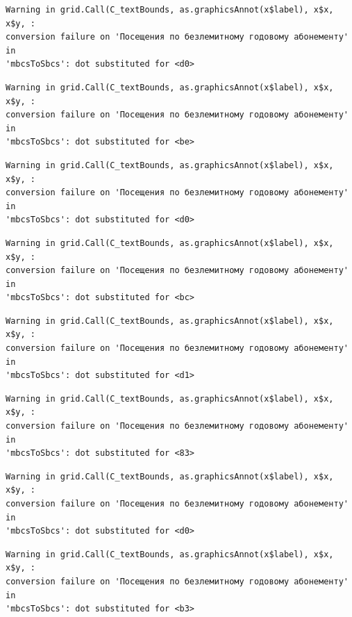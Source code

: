 \documentclass[
  letterpaper,
  DIV=11,
  numbers=noendperiod]{scrartcl}
\begin{document}
\begin{verbatim}
Warning in grid.Call(C_textBounds, as.graphicsAnnot(x$label), x$x, x$y, :
conversion failure on 'Посещения по безлемитному годовому абонементу' in
'mbcsToSbcs': dot substituted for <d0>
\end{verbatim}

\begin{verbatim}
Warning in grid.Call(C_textBounds, as.graphicsAnnot(x$label), x$x, x$y, :
conversion failure on 'Посещения по безлемитному годовому абонементу' in
'mbcsToSbcs': dot substituted for <be>
\end{verbatim}

\begin{verbatim}
Warning in grid.Call(C_textBounds, as.graphicsAnnot(x$label), x$x, x$y, :
conversion failure on 'Посещения по безлемитному годовому абонементу' in
'mbcsToSbcs': dot substituted for <d0>
\end{verbatim}

\begin{verbatim}
Warning in grid.Call(C_textBounds, as.graphicsAnnot(x$label), x$x, x$y, :
conversion failure on 'Посещения по безлемитному годовому абонементу' in
'mbcsToSbcs': dot substituted for <bc>
\end{verbatim}

\begin{verbatim}
Warning in grid.Call(C_textBounds, as.graphicsAnnot(x$label), x$x, x$y, :
conversion failure on 'Посещения по безлемитному годовому абонементу' in
'mbcsToSbcs': dot substituted for <d1>
\end{verbatim}

\begin{verbatim}
Warning in grid.Call(C_textBounds, as.graphicsAnnot(x$label), x$x, x$y, :
conversion failure on 'Посещения по безлемитному годовому абонементу' in
'mbcsToSbcs': dot substituted for <83>
\end{verbatim}

\begin{verbatim}
Warning in grid.Call(C_textBounds, as.graphicsAnnot(x$label), x$x, x$y, :
conversion failure on 'Посещения по безлемитному годовому абонементу' in
'mbcsToSbcs': dot substituted for <d0>
\end{verbatim}

\begin{verbatim}
Warning in grid.Call(C_textBounds, as.graphicsAnnot(x$label), x$x, x$y, :
conversion failure on 'Посещения по безлемитному годовому абонементу' in
'mbcsToSbcs': dot substituted for <b3>
\end{verbatim}
\end{document}
